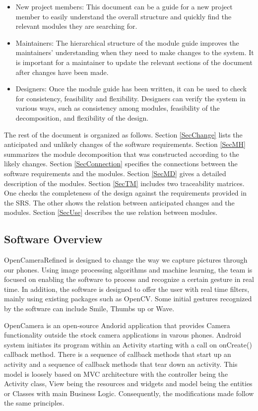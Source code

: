 \documentclass[12pt, titlepage]{article}
\begin{document}
\begin{itemize}
\item New project members: This document can be a guide for a new project member
  to easily understand the overall structure and quickly find the
  relevant modules they are searching for.
\item Maintainers: The hierarchical structure of the module guide improves the
  maintainers' understanding when they need to make changes to the system. It is
  important for a maintainer to update the relevant sections of the document
  after changes have been made.
\item Designers: Once the module guide has been written, it can be used to
  check for consistency, feasibility and flexibility. Designers can verify the
  system in various ways, such as consistency among modules, feasibility of the
  decomposition, and flexibility of the design.
\end{itemize}

The rest of the document is organized as follows. Section
\ref{SecChange} lists the anticipated and unlikely changes of the software
requirements. Section \ref{SecMH} summarizes the module decomposition that
was constructed according to the likely changes. Section \ref{SecConnection}
specifies the connections between the software requirements and the
modules. Section \ref{SecMD} gives a detailed description of the
modules. Section \ref{SecTM} includes two traceability matrices. One checks
the completeness of the design against the requirements provided in the SRS. The
other shows the relation between anticipated changes and the modules. Section
\ref{SecUse} describes the use relation between modules.
\subsection{Software Overview}
OpenCameraRefined is designed to change the way we capture pictures through our phones. Using image processing algorithms and machine learning, the team is focused on enabling the software to process and recognize a certain gesture in real time. In addition, the software is designed to offer the user with real time filters, mainly using existing packages such as OpenCV. Some initial gestures recognized by the software can include Smile, Thumbs up or Wave. 

OpenCamera is an open-source Andorid application that provides Camera functionality outside the stock camera applications in varous phones. Android system initiates its program within an Activity starting with a call on onCreate() callback method. There is a sequence of callback methods that start up an activity and a sequence of callback methods that tear down an activity. This model is loosely based on MVC architecture with the controller being the Activity class, View being the resources and widgets and model being the entities or Classes with main Business Logic. Consequently, the modifications made follow the same principles. 
\end{document}

